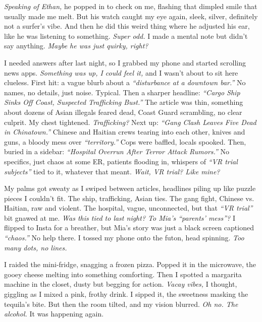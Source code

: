 \documentclass[12pt]{article}
\begin{document}
\textit{Speaking of \textnormal{Ethan},} he popped in to check on me, flashing that dimpled smile that usually made me melt. But his watch caught my eye again, sleek, silver, definitely not a surfer’s vibe. And then he did this weird thing where he adjusted his ear, like he was listening to something. \textit{Super odd.} I made a mental note but didn’t say anything. \textit{Maybe he was just quirky, right?}

I needed answers after last night, so I grabbed my phone and started scrolling news apps. \textit{Something was up, I could feel it,} and I wasn’t about to sit here clueless. First hit: a vague blurb about a \textit{“disturbance at a downtown bar.”} No names, no details, just noise. Typical. Then a sharper headline: \textit{“Cargo Ship Sinks Off Coast, Suspected Trafficking Bust.”} The article was thin, something about dozens of Asian illegals feared dead, Coast Guard scrambling, no clear culprit. My chest tightened. \textit{Trafficking?} Next up: \textit{“Gang Clash Leaves Five Dead in Chinatown.”} Chinese and Haitian crews tearing into each other, knives and guns, a bloody mess over \textit{“territory.”} Cops were baffled, locals spooked. Then, buried in a sidebar: \textit{“Hospital Overrun After Terror Attack Rumors.”} No specifics, just chaos at some ER, patients flooding in, whispers of \textit{“VR trial subjects”} tied to it, whatever that meant. \textit{Wait, VR trial? Like mine?}

My palms got sweaty as I swiped between articles, headlines piling up like puzzle pieces I couldn’t fit. The ship, trafficking, Asian ties. The gang fight, Chinese vs. Haitian, raw and violent. The hospital, vague, unconnected, but that \textit{“VR trial”} bit gnawed at me. \textit{Was this tied to last night? To \textnormal{Mia}’s “parents’ mess”?} I flipped to Insta for a breather, but \textnormal{Mia}’s story was just a black screen captioned \textit{“chaos.”} No help there. I tossed my phone onto the futon, head spinning. \textit{Too many dots, no lines.}

I raided the mini-fridge, snagging a frozen pizza. Popped it in the microwave, the gooey cheese melting into something comforting. Then I spotted a margarita machine in the closet, dusty but begging for action. \textit{Vacay vibes,} I thought, giggling as I mixed a pink, frothy drink. I sipped it, the sweetness masking the tequila’s bite. But then the room tilted, and my vision blurred. \textit{Oh no. The alcohol.} It was happening again.
\end{document}
